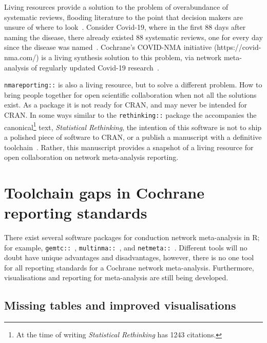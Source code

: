\documentclass[12pt]{article}\usepackage[]{graphicx}\usepackage[]{color}
\newcommand{\package}[1]{\texttt{{#1::}}}
\begin{document}
Living resources provide a solution to the problem of overabundance of systematic reviews, flooding literature to the point that decision makers are unsure of where to look~\cite{gopalakrishnan_systematic_2013, moher_problem_2013, moller_are_2018, richards_too_2018}. Consider Covid-19, where in the first 88 days after naming the disease, there already existed 88 systematic reviews, one for every day since the disease was named~\cite{naumann_too_2021}. Cochrane's COVID-NMA initiative (https://covid-nma.com/) is a living synthesis solution to this problem, via network meta-analysis of regularly updated Covid-19 research~\cite{boutron_covid-nma_2020}.

\package{nmareporting} is also a living resource, but to solve a different problem. How to bring people together for open scientific collaboration when not all the solutions exist. As a package it is not ready for CRAN, and may never be intended for CRAN. In some ways similar to the \package{rethinking} package the accompanies the canonical\footnote{
At the time of writing \emph{Statistical Rethinking} has 1243 citations.
} text, \emph{Statistical Rethinking}, the intention of this software is not to ship a polished piece of software to CRAN, or a publish a manuscript with a definitive toolchain~\cite{statrethinkingbook}. Rather, this manuscript provides a snapshot of a living resource for open collaboration on network meta-analysis reporting.

\section{Toolchain gaps in Cochrane reporting standards}

There exist several software packages for conduction network meta-analysis in R; for example, \package{gemtc}~\cite{valkenhoef_gemtc_2020}, \package{multinma}~\cite{phillippo_multinma_2020}, and \package{netmeta}~\cite{rucker_netmeta_2021}. Different tools will no doubt have unique advantages and disadvantages, however, there is no one tool for all reporting standards for a Cochrane network meta-analysis. Furthermore, visualisations and reporting for meta-analysis are still being developed.

\subsection{Missing tables and improved visualisations}

\end{document}
